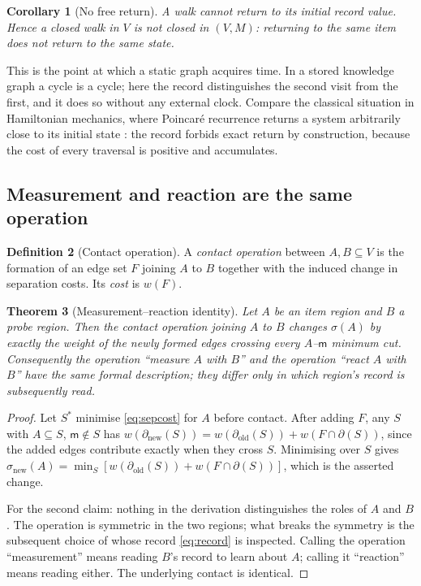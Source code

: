 \documentclass[11pt,twocolumn,a4paper]{article}
\theoremstyle{thmstyle}
\newtheorem{theorem}{Theorem}[section]
\newtheorem{corollary}[theorem]{Corollary}
\theoremstyle{definition}
\newtheorem{definition}[theorem]{Definition}
\theoremstyle{remark}
\newcommand{\V}{V}
\newcommand{\wt}{w}
\newcommand{\med}{\mathsf{m}}
\newcommand{\cut}{\partial}
\newcommand{\str}{\sigma}
\newcommand{\rec}{M}
\begin{document}
\begin{corollary}[No free return]
\label{cor:no-return}
A walk cannot return to its initial record value. Hence a closed walk
in $\V$ is not closed in $(\V,\rec)$: returning to the same item does
not return to the same state.
\end{corollary}

This is the point at which a static graph acquires time. In a stored
knowledge graph a cycle is a cycle; here the record distinguishes the
second visit from the first, and it does so without any external
clock. Compare the classical situation in Hamiltonian mechanics, where
Poincar\'e recurrence returns a system arbitrarily close to its
initial state \citep{poincare1890,kac1947}: the record forbids exact
return by construction, because the cost of every traversal is
positive and accumulates.

\subsection{Measurement and reaction are the same operation}

\begin{definition}[Contact operation]
\label{def:contact-op}
A \emph{contact operation} between $A, B \subseteq \V$ is the
formation of an edge set $F$ joining $A$ to $B$ together with the
induced change in separation costs. Its \emph{cost} is $\wt(F)$.
\end{definition}

\begin{theorem}[Measurement--reaction identity]
\label{thm:reaction-measurement}
Let $A$ be an item region and $B$ a probe region. Then the contact
operation joining $A$ to $B$ changes $\str(A)$ by exactly the weight
of the newly formed edges crossing every $A$--$\med$ minimum cut.
Consequently the operation ``measure $A$ with $B$'' and the operation
``react $A$ with $B$'' have the same formal description; they differ
only in which region's record is subsequently read.
\end{theorem}

\begin{proof}
Let $S^{*}$ minimise \eqref{eq:sepcost} for $A$ before contact. After
adding $F$, any $S$ with $A \subseteq S$, $\med \notin S$ has
$\wt(\cut_{\text{new}}(S)) = \wt(\cut_{\text{old}}(S)) +
\wt(F \cap \cut(S))$, since the added edges contribute exactly when
they cross $S$. Minimising over $S$ gives
$\str_{\text{new}}(A) = \min_S [\wt(\cut_{\text{old}}(S)) +
\wt(F \cap \cut(S))]$, which is the asserted change.

For the second claim: nothing in the derivation distinguishes the
roles of $A$ and $B$. The operation is symmetric in the two regions;
what breaks the symmetry is the subsequent choice of whose record
\eqref{eq:record} is inspected. Calling the operation ``measurement''
means reading $B$'s record to learn about $A$; calling it ``reaction''
means reading either. The underlying contact is identical.
\end{proof}
\end{document}
